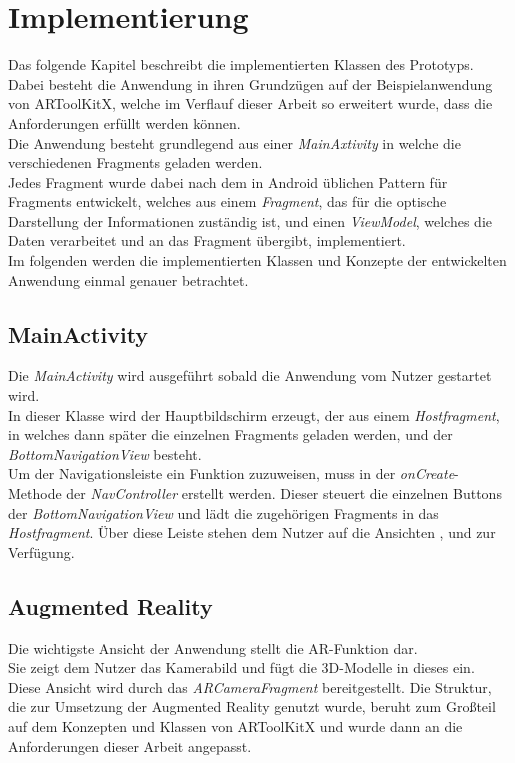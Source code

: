 \chapter{Implementierung}\label{chapter:implementierung}
Das folgende Kapitel beschreibt die implementierten Klassen des Prototyps.\\
Dabei besteht die Anwendung in ihren Grundzügen auf der Beispielanwendung von ARToolKitX, welche im Verflauf dieser Arbeit so erweitert wurde, dass die Anforderungen erfüllt werden können.\\
Die Anwendung besteht grundlegend aus einer \textit{MainAxtivity} in welche die verschiedenen Fragments geladen werden.\\
Jedes Fragment wurde dabei nach dem in Android üblichen Pattern für Fragments entwickelt, welches aus einem \textit{Fragment}, das für die optische Darstellung der Informationen zuständig ist, und einen \textit{ViewModel}, welches die Daten verarbeitet und an das Fragment übergibt, implementiert.\\
Im folgenden werden die implementierten Klassen und Konzepte der entwickelten Anwendung einmal genauer betrachtet.

\section{MainActivity}
Die \textit{MainActivity} wird ausgeführt sobald die Anwendung vom Nutzer gestartet wird.\\
In dieser Klasse wird der Hauptbildschirm erzeugt, der aus einem \textit{Hostfragment}, in welches dann später die einzelnen Fragments geladen werden, und der \textit{BottomNavigationView} besteht. \\
Um der Navigationsleiste ein Funktion zuzuweisen, muss in der \textit{onCreate}-Methode der \textit{NavController} erstellt werden. Dieser steuert die einzelnen Buttons der \textit{BottomNavigationView} und lädt die zugehörigen Fragments in das \textit{Hostfragment}. Über diese Leiste stehen dem Nutzer auf die Ansichten ,  und  zur Verfügung.


\section{Augmented Reality}\label{impl:ar}
Die wichtigste Ansicht der Anwendung stellt die AR-Funktion dar. \\ 
Sie zeigt dem Nutzer das Kamerabild und fügt die 3D-Modelle in dieses ein.\\
Diese Ansicht wird durch das \textit{ARCameraFragment} bereitgestellt.
Die Struktur, die zur Umsetzung der Augmented Reality genutzt wurde, beruht zum Großteil auf dem Konzepten und Klassen von ARToolKitX und wurde dann an die Anforderungen dieser Arbeit angepasst.


